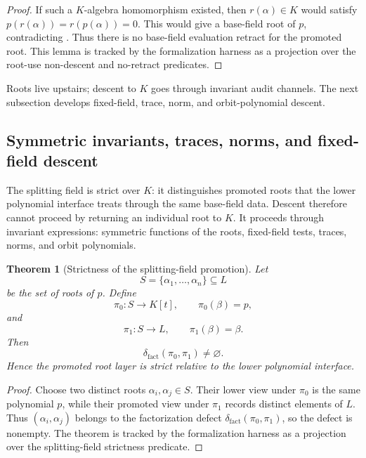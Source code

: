 \documentclass[11pt]{article}
\newtheorem{theorem}{Theorem}[section]
\theoremstyle{definition}
\begin{document}
\begin{proof}
If such a \(K\)-algebra homomorphism existed, then \(r(\alpha)\in K\) would
satisfy \(p(r(\alpha))=r(p(\alpha))=0\).  This would give a base-field root of
\(p\), contradicting .  Thus there is no base-field
evaluation retract for the promoted root.  This lemma is tracked by the
formalization harness as a projection over the root-use non-descent and
no-retract predicates.
\end{proof}

Roots live upstairs; descent to \(K\) goes through invariant audit channels.  The
next subsection develops fixed-field, trace, norm, and orbit-polynomial descent.

\subsection{Symmetric invariants, traces, norms, and fixed-field descent}
\label{subsec:gal-invariants-trace-norm-fixed-field}

The splitting field is strict over \(K\): it distinguishes promoted roots that
the lower polynomial interface treats through the same base-field data.  Descent
therefore cannot proceed by returning an individual root to \(K\).  It proceeds
through invariant expressions: symmetric functions of the roots, fixed-field
tests, traces, norms, and orbit polynomials.

\begin{theorem}[Strictness of the splitting-field promotion]
\label{thm:gal-strictness}
Let
\[
S=\{\alpha_1,\ldots,\alpha_n\}\subseteq L
\]
be the set of roots of \(p\).  Define
\[
\pi_0:S\to K[t],
\qquad
\pi_0(\beta)=p,
\]
and
\[
\pi_1:S\to L,
\qquad
\pi_1(\beta)=\beta.
\]
Then
\[
\delta_{\mathrm{fact}}(\pi_0,\pi_1)\neq\varnothing.
\]
Hence the promoted root layer is strict relative to the lower polynomial interface.
\end{theorem}

\begin{proof}
Choose two distinct roots \(\alpha_i,\alpha_j\in S\).  Their lower view under
\(\pi_0\) is the same polynomial \(p\), while their promoted view under
\(\pi_1\) records distinct elements of \(L\).  Thus
\((\alpha_i,\alpha_j)\) belongs to the factorization defect
\(\delta_{\mathrm{fact}}(\pi_0,\pi_1)\), so the defect is nonempty.  The theorem
is tracked by the formalization harness as a projection over the splitting-field
strictness predicate.
\end{proof}
\end{document}
